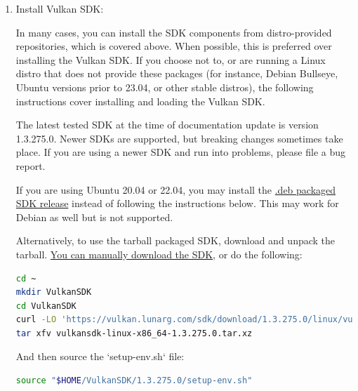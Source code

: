 \begin{enumerate}
\subsubsection{Alpine Linux}

As Alpine Linux uses musl libc, you will need to use system-provided Vulkan packages, and not the Vulkan SDK.
\begin{lstlisting}[language=sh, numbers=none]
apk add git gcc g++ cmake make pkgconf gtk+3.0-dev libsigc++-dev yaml-cpp-dev catch2-3 vulkan-loader-dev glslang-dev glslang-static glfw-dev shaderc-dev spirv-tools-dev libhidapi-dev
\end{lstlisting}

If you are using an older stable release (such as CentOS 7), you may need to install some dependencies from source.

\item Install Vulkan SDK:

In many cases, you can install the SDK components from distro-provided repositories, which is covered above. When
possible, this is preferred over installing the Vulkan SDK. If you choose not to, or are running a Linux distro that
does not provide these packages (for instance, Debian Bullseye, Ubuntu versions prior to 23.04, or other stable
distros), the following instructions cover installing and loading the Vulkan SDK.

The latest tested SDK at the time of documentation update is version 1.3.275.0. Newer SDKs are supported, but breaking
changes sometimes take place.
If you are using a newer SDK and run into problems, please file a bug report.

If you are using Ubuntu 20.04 or 22.04, you may install the
\href{https://packages.lunarg.com}{.deb packaged SDK release} instead of following the instructions below. This may
work for Debian as well but is not supported.

Alternatively, to use the tarball packaged SDK, download and unpack the tarball.
\href{https://vulkan.lunarg.com/sdk/home}{You can manually download the SDK}, or do the following:
\begin{lstlisting}[language=sh, numbers=none]
cd ~
mkdir VulkanSDK
cd VulkanSDK
curl -LO 'https://vulkan.lunarg.com/sdk/download/1.3.275.0/linux/vulkansdk-linux-x86_64-1.3.275.0.tar.xz'
tar xfv vulkansdk-linux-x86_64-1.3.275.0.tar.xz
\end{lstlisting}

And then source the `setup-env.sh` file:
\begin{lstlisting}[language=sh, numbers=none]
source "$HOME/VulkanSDK/1.3.275.0/setup-env.sh"
\end{lstlisting}


\end{enumerate}
